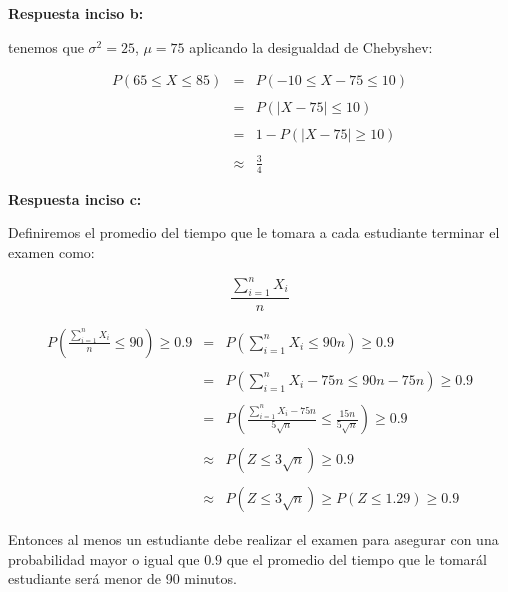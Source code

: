\documentclass[10pt]{article}
\begin{document}
	\begin{flushleft}
		{\bf Respuesta inciso b:}
	\end{flushleft}

	\begin{flushleft}
		tenemos que $\sigma^2=25$, $\mu=75$ aplicando la desigualdad de Chebyshev:\\
	\end{flushleft}

	\begin{equation*}
		\begin{array}{rcl}
			\displaystyle P(65 \leq X \leq 85)&= & \displaystyle P(-10 \leq X-75 \leq 10)
			\\
			\\
			&=&P(|X-75|\leq 10)
			\\
			\\
			&=&1-P(|X-75|\geq 10)
			\\
			\\
			&\approx & \displaystyle  \frac{3}{4}
		\end{array}
	\end{equation*}


	\begin{flushleft}
		{\bf Respuesta inciso c:}
	\end{flushleft}

 
	\begin{flushleft}
		Definiremos el promedio del tiempo que le tomara a cada estudiante terminar el examen como:
	\end{flushleft}

	\begin{equation*}
		\frac{\sum_{i=1}^{n}X_i}{n}
	\end{equation*}
 
  	\begin{equation*}
	  	\begin{array}{rcl}
			P(\frac{\sum_{i=1}^{n}X_i}{n} \leq 90)\geq 0.9&= &P(\sum_{i=1}^{n}X_i \leq 90n)\geq 0.9
			\\
			\\
			&=&P(\sum_{i=1}^{n}X_i -75n\leq 90n-75n)\geq 0.9
			\\
			\\
			&=&P(\frac{\sum_{i=1}^{n}X_i -75n}{5\sqrt{n}}\leq \frac{15n}{5\sqrt{n}})\geq 0.9
			\\
			\\
			&\approx & P(Z \leq 3\sqrt{n} )\geq 0.9
			\\
			\\
			&\approx & P(Z\leq 3\sqrt{n})\geq P(Z\leq 1.29)\geq 0.9
		\end{array}
	\end{equation*}

	\begin{flushleft}
		Entonces al menos un estudiante debe realizar el examen para asegurar con una probabilidad mayor o igual que $0.9$ que el promedio del tiempo que le tomar\' al estudiante ser\'a menor de 90 minutos.
	\end{flushleft}
 
\end{document}
